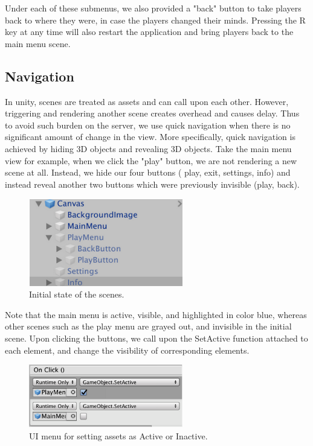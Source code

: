 \documentclass[a4paper,10pt]{article}
\begin{document}
Under each of these submenus, we also provided a "back" button to take players back to where they were, in case the players changed their minds. Pressing the R key at any time will also restart the application and bring players back to the main menu scene.


\subsection{Navigation}
In unity, scenes are treated as assets and can call upon each other. However, triggering and rendering another scene creates overhead and causes delay. Thus to avoid such burden on the server, we use quick navigation when there is no significant amount of change in the view. More specifically, quick navigation is achieved by hiding 3D objects and revealing 3D objects. Take the main menu view for example, when we click the "play" button, we are not rendering a new scene at all. Instead, we hide our four buttons ( play, exit, settings, info) and instead reveal another two buttons which were previously invisible (play, back). 

 \begin{figure}[H]
  \centering
      \includegraphics[width=0.6\textwidth]{Assets/InitialScenes.png}
  \caption{Initial state of the scenes.}
\end{figure}

Note that the main menu is active, visible, and highlighted in color blue, whereas other scenes such as the play menu are grayed out, and invisible in the initial scene. Upon clicking the buttons, we call upon the SetActive function attached to each element, and change the visibility of corresponding elements. 

 \begin{figure}[H]
  \centering
      \includegraphics[width=0.6\textwidth]{Assets/OnClick.png}
  \caption{UI menu for setting assets as Active or Inactive.}
\end{figure}
\end{document}
